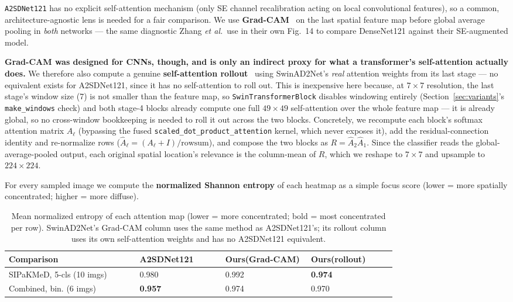 \documentclass[10pt,twocolumn]{article}
\newcommand{\code}[1]{\texttt{\small #1}}
\begin{document}
\code{A2SDNet121} has no explicit self-attention mechanism (only SE channel recalibration acting on local convolutional features), so a common, architecture-agnostic lens is needed for a fair comparison. We use \textbf{Grad-CAM}~\cite{selvaraju2017} on the last spatial feature map before global average pooling in \emph{both} networks --- the same diagnostic Zhang \emph{et al.}\ use in their own Fig.~14 to compare DenseNet121 against their SE-augmented model.

\textbf{Grad-CAM was designed for CNNs, though, and is only an indirect proxy for what a transformer's self-attention actually does.} We therefore also compute a genuine \textbf{self-attention rollout}~\cite{abnar2020} using SwinAD2Net's \emph{real} attention weights from its last stage --- no equivalent exists for A2SDNet121, since it has no self-attention to roll out. This is inexpensive here because, at $7{\times}7$ resolution, the last stage's window size (7) is not smaller than the feature map, so \code{SwinTransformerBlock} disables windowing entirely (Section~\ref{sec:variants}'s \code{make\_windows} check) and both stage-4 blocks already compute one full $49{\times}49$ self-attention over the whole feature map --- it is already global, so no cross-window bookkeeping is needed to roll it out across the two blocks. Concretely, we recompute each block's softmax attention matrix $A_\ell$ (bypassing the fused \code{scaled\_dot\_product\_attention} kernel, which never exposes it), add the residual-connection identity and re-normalize rows ($\hat{A}_\ell = (A_\ell + I) / \text{rowsum}$), and compose the two blocks as $R = \hat{A}_2 \hat{A}_1$. Since the classifier reads the global-average-pooled output, each original spatial location's relevance is the column-mean of $R$, which we reshape to $7{\times}7$ and upsample to $224{\times}224$.

For every sampled image we compute the \textbf{normalized Shannon entropy} of each heatmap as a simple focus score (lower = more spatially concentrated; higher = more diffuse).

\begin{table}[H]
\centering\scriptsize
\begin{tabular}{@{}p{0.26\linewidth}p{0.17\linewidth}p{0.17\linewidth}p{0.17\linewidth}@{}}
\toprule
\textbf{Comparison} & \textbf{A2SDNet121} & \textbf{Ours}\newline\textbf{(Grad-CAM)} & \textbf{Ours}\newline\textbf{(rollout)} \\
\midrule
SIPaKMeD, 5-cls (10 imgs) & 0.980 & 0.992 & \textbf{0.974} \\[2pt]
Combined, bin. (6 imgs) & \textbf{0.957} & 0.974 & 0.970 \\
\bottomrule
\end{tabular}
\caption{Mean normalized entropy of each attention map (lower = more concentrated; bold = most concentrated per row). SwinAD2Net's Grad-CAM column uses the same method as A2SDNet121's; its rollout column uses its own self-attention weights and has no A2SDNet121 equivalent.}
\label{tab:entropy}
\end{table}
\end{document}

